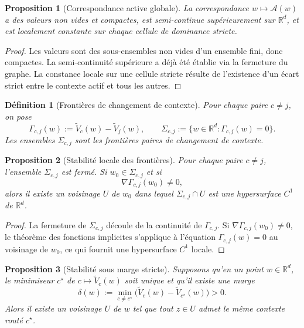 \documentclass[11pt,a4paper]{article}
\newtheorem{definition}{Définition}[section]
\newtheorem{proposition}{Proposition}[section]
\newcommand{\R}{\mathbb R}
\begin{document}
\begin{proposition}[Correspondance active globale]
La correspondance \(w\mapsto \mathcal A(w)\) a des valeurs non vides et compactes, est semi-continue supérieurement sur \(\R^d\), et est localement constante sur chaque cellule de dominance stricte.
\end{proposition}

\begin{proof}
Les valeurs sont des sous-ensembles non vides d'un ensemble fini, donc compactes. La semi-continuité supérieure a déjà été établie via la fermeture du graphe. La constance locale sur une cellule stricte résulte de l'existence d'un écart strict entre le contexte actif et tous les autres.
\end{proof}

\begin{definition}[Frontières de changement de contexte]
Pour chaque paire \(c\neq j\), on pose
\[
\Gamma_{c,j}(w):=\widetilde V_c(w)-\widetilde V_j(w),
\qquad
\Sigma_{c,j}:=\{w\in\R^d:\Gamma_{c,j}(w)=0\}.
\]
Les ensembles \(\Sigma_{c,j}\) sont les frontières paires de changement de contexte.
\end{definition}

\begin{proposition}[Stabilité locale des frontières]
Pour chaque paire \(c\neq j\), l'ensemble \(\Sigma_{c,j}\) est fermé. Si \(w_0\in\Sigma_{c,j}\) et si
\[
\nabla \Gamma_{c,j}(w_0)\neq 0,
\]
alors il existe un voisinage \(U\) de \(w_0\) dans lequel \(\Sigma_{c,j}\cap U\) est une hypersurface \(C^1\) de \(\R^d\).
\end{proposition}

\begin{proof}
La fermeture de \(\Sigma_{c,j}\) découle de la continuité de \(\Gamma_{c,j}\). Si \(\nabla \Gamma_{c,j}(w_0)\neq 0\), le théorème des fonctions implicites s'applique à l'équation \(\Gamma_{c,j}(w)=0\) au voisinage de \(w_0\), ce qui fournit une hypersurface \(C^1\) locale.
\end{proof}

\begin{proposition}[Stabilité sous marge stricte]
Supposons qu'en un point \(w\in\R^d\), le minimiseur \(c^\star\) de \(c\mapsto \widetilde V_c(w)\) soit unique et qu'il existe une marge
\[
\delta(w):=\min_{c\neq c^\star}\bigl(\widetilde V_c(w)-\widetilde V_{c^\star}(w)\bigr)>0.
\]
Alors il existe un voisinage \(U\) de \(w\) tel que tout \(z\in U\) admet le même contexte routé \(c^\star\).
\end{proposition}
\end{document}
